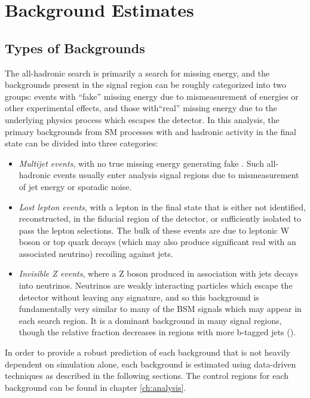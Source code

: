 \chapter{Background Estimates}
\label{ch:bkgs}

\section{Types of Backgrounds}
\label{sec:bkgs}
The \mttwo all-hadronic search is primarily a search for missing energy, and the backgrounds present in the signal region can be roughly categorized into two groups: events with ``fake'' missing energy due to mismeasurement of energies or other experimental effects, and those with``real'' missing energy due to the underlying physics process which escapes the detector. In this analysis, the primary backgrounds from SM processes with \MET and hadronic activity in the final state can be divided into three categories:
\begin{itemize}
	\item {\it Multijet events}, with no true missing energy generating fake \MET. Such all-hadronic events usually enter analysis signal regions due to mismeasurement of jet energy or sporadic noise.
	\item {\it Lost lepton events}, with a lepton in the final state that is either not identified, reconstructed, in the fiducial region of the detector, or sufficiently isolated to pass the lepton selections. The bulk of these events are due to leptonic W boson or top quark decays (which may also produce significant real \MET with an associated neutrino) recoiling against jets.
	\item {\it Invisible Z events}, where a Z boson produced in association with jets decays into neutrinos. Neutrinos are weakly interacting particles which escape the detector without leaving any signature, and so this background is fundamentally very similar to many of the BSM signals which may appear in each search region. It is a dominant background in many signal regions, though the relative fraction decreases in regions with more b-tagged jets (\nb).
\end{itemize}

In order to provide a robust prediction of each background that is not heavily dependent on simulation alone, each background is estimated using data-driven techniques as described in the following sections. The control regions for each background can be found in chapter \ref{ch:analysis}.

